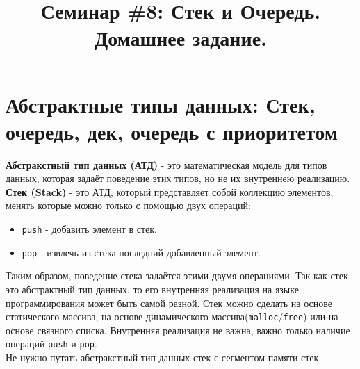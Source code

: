 \documentclass{article}
\begin{document}

\title{Семинар \#8: Стек и Очередь. Домашнее задание.\vspace{-5ex}}\date{}\maketitle

\section*{Абстрактные типы данных: Стек, очередь, дек, очередь с приоритетом}
\quad

\textbf{Абстракстный тип данных (АТД)} - это математическая модель для типов данных, которая задаёт поведение этих типов, но не их внутреннею реализацию.\\

\textbf{Стек (Stack)} - это АТД, который представляет собой коллекцию элементов, менять которые можно только с помощью двух операций:
\begin{itemize}
\item \texttt{push} - добавить элемент в стек.
\item \texttt{pop} - извлечь из стека последний добавленный элемент.
\end{itemize}
Таким образом, поведение стека задаётся этими двумя операциями. Так как стек - это абстрактный тип данных, то его внутренняя реализация на языке программирования может быть самой разной. Стек можно сделать на основе статического массива, на основе динамического массива(\texttt{malloc}/\texttt{free}) или на основе связного списка. Внутренняя реализация не важна, важно только наличие операций \texttt{push} и \texttt{pop}. \\
Не нужно путать абстракстный тип данных стек с сегментом памяти стек.\\
\end{document}
